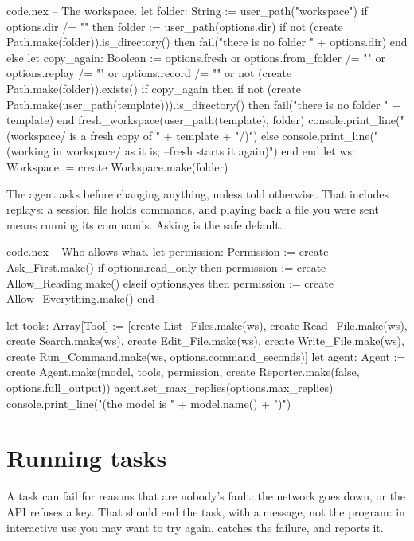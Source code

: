 \begin{continued}{code.nex}
-- The workspace.
let folder: String := user_path("workspace")
if options.dir /= "" then
  folder := user_path(options.dir)
  if not (create Path.make(folder)).is_directory() then
    fail("there is no folder " + options.dir)
  end
else
  let copy_again: Boolean := options.fresh or options.from_folder /= "" or options.replay /= ""
    or options.record /= "" or not (create Path.make(folder)).exists()
  if copy_again then
    if not (create Path.make(user_path(template))).is_directory() then
      fail("there is no folder " + template)
    end
    fresh_workspace(user_path(template), folder)
    console.print_line("(workspace/ is a fresh copy of " + template + "/)")
  else
    console.print_line("(working in workspace/ as it is; --fresh starts it again)")
  end
end
let ws: Workspace := create Workspace.make(folder)
\end{continued}

The agent asks before changing anything, unless told otherwise. That
includes replays: a session file holds commands, and playing back a file
you were sent means running its commands. Asking is the safe default.

\begin{continued}{code.nex}
-- Who allows what.
let permission: Permission := create Ask_First.make()
if options.read_only then
  permission := create Allow_Reading.make()
elseif options.yes then
  permission := create Allow_Everything.make()
end

let tools: Array[Tool] := [create List_Files.make(ws), create Read_File.make(ws),
  create Search.make(ws), create Edit_File.make(ws), create Write_File.make(ws),
  create Run_Command.make(ws, options.command_seconds)]
let agent: Agent := create Agent.make(model, tools, permission,
  create Reporter.make(false, options.full_output))
agent.set_max_replies(options.max_replies)
console.print_line("(the model is " + model.name() + ")")
\end{continued}

\section{Running tasks}

A task can fail for reasons that are nobody's fault: the network goes
down, or the API refuses a key. That should end the task, with a message,
not the program: in interactive use you may want to try again.
 catches the failure, and reports it.


